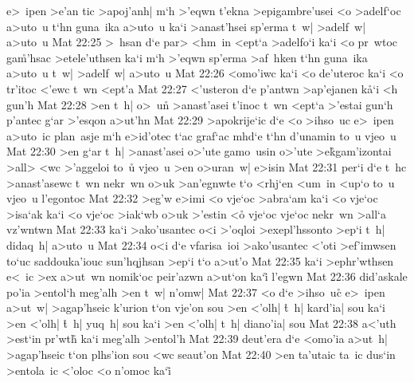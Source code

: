 e>~ipen
>e'an
tic
>apoj'anh|
m`h
>'eqwn
t'ekna
>epigambre'usei
<o
>adelf`oc
a>uto~u
t`hn
guna~ika
a>uto~u
ka`i
>anast'hsei
sp'erma
t~w|
>adelf~w|
a>uto~u\bibvsend
\vs Mat 22:25
>~hsan
d`e
par>
<hm~in
<ept`a
>adelfo`i
ka`i
<o
pr~wtoc
ga\r{m}'hsac
>etele'uthsen
ka`i
m`h
>'eqwn
sp'erma
>af~hken
t`hn
guna~ika
a>uto~u
t~w|
>adelf~w|
a>uto~u\bibvsend
\vs Mat 22:26
<omo'iwc
ka`i
<o
de'uteroc
ka`i
<o
tr'itoc
<'ewc
t~wn
<ept'a\bibvsend
\vs Mat 22:27
<'usteron
d`e
p'antwn
>ap'ejanen
k\r{a}`i
<h
gun'h\bibvsend
\vs Mat 22:28
>en
t~h|
o>~un\r{}
>anast'asei
t'inoc
t~wn
<ept`a
>'estai
gun`h
p'antec
g`ar
>'esqon
a>ut'hn\bibvsend
\vs Mat 22:29
>apokrije`ic
d`e
<o
>ihso~uc
e>~ipen
a>uto~ic
plan~asje
m`h
e>id'otec
t`ac
graf`ac
mhd`e
t`hn
d'unamin
to~u
vjeo~u\bibvsend
\vs Mat 22:30
>en
g`ar
t~h|
>anast'asei
o>'ute
gamo~usin
o>'ute
>e\r{k}gam'izontai
>all>
<wc
>'aggeloi
to~u\r{}
vjeo~u
>en
o>uran~w|
e>isin\bibvsend
\vs Mat 22:31
per`i
d`e
t~hc
>anast'asewc
t~wn
nekr~wn
o>uk
>an'egnwte
t`o
<rhj`en
<um~in
<up`o
to~u
vjeo~u
l'egontoc\bibvsend
\vs Mat 22:32
>eg'w
e>imi
<o
vje`oc
>abra`am
ka`i
<o
vje`oc
>isa`ak
ka`i
<o
vje`oc
>iak`wb
o>uk
>'estin
<o\r{}
vje`oc
vje`oc
nekr~wn
>all`a
vz'wntwn\bibvsend
\vs Mat 22:33
ka`i
>ako'usantec
o<i
>'oqloi
>exepl'hssonto
>ep`i
t~h|
didaq~h|
a>uto~u\bibvsend
\vs Mat 22:34
o<i
d`e
vfarisa~ioi
>ako'usantec
<'oti
>ef'imwsen
to`uc
saddouka'iouc
sun'hqjhsan
>ep`i
t`o
a>ut'o\bibvsend
\vs Mat 22:35
ka`i
>ephr'wthsen
e<~ic
>ex
a>ut~wn
nomik`oc
peir'azwn
a>ut`on
ka`i\r{}
l'egwn\bibvsend
\vs Mat 22:36
did'askale
po'ia
>entol`h
meg'alh
>en
t~w|
n'omw|\bibvsend
\vs Mat 22:37
<o
d`e
>ihso~uc\r{}
e>~ipen
a>ut~w|
>agap'hseic
k'urion
t`on
vje'on
sou
>en
<'olh|
\r{t}~h|
kard'ia|
sou
ka`i
>en
<'olh|
\r{t}~h|
yuq~h|
sou
ka`i
>en
<'olh|
t~h|
diano'ia|
sou\bibvsend
\vs Mat 22:38
a<'uth
>est`in
pr'wth\r{}
ka`i
meg'alh
>entol'h\bibvsend
\vs Mat 22:39
deut'era
d`e
<omo'ia
a>ut~h|
>agap'hseic
t`on
plhs'ion
sou
<wc
seaut'on\bibvsend
\vs Mat 22:40
>en
ta'utaic
ta~ic
dus`in
>entola~ic
<'oloc
<o
n'omoc
ka`i\r{}
